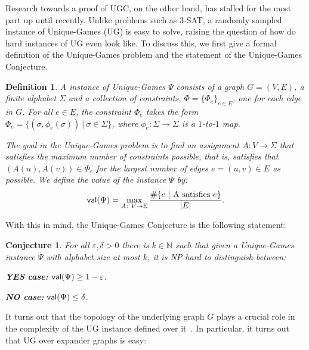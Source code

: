 \documentclass[11pt]{article}
\def \eps {{\varepsilon}}
\newtheorem{conjecture}[theorem]{Conjecture}
\newtheorem{definition}[theorem]{Definition}
\theoremstyle{definition}
\begin{document}
Research towards a proof of UGC, on the other hand, 
has stalled for the most part up until recently. Unlike problems such 
as $3$-SAT, a randomly sampled instance of Unique-Games (UG) is easy to solve, raising the question of how do hard instances of UG
even look like. To discuss this, we first give 
a formal definition of the Unique-Games problem and the statement of the Unique-Games Conjecture.
\begin{definition}
A instance of Unique-Games $\Psi$ consists of a graph $G = (V,E)$, 
a finite alphabet $\Sigma$ and a collection of constraints, 
$\Phi = \{\Phi_e\}_{e\in E}$, one for each edge in $G$. 
For all $e\in E$, the constraint $\Phi_e$ takes the form 
$\Phi_e = \{(\sigma, \phi_e(\sigma))~|~\sigma\in \Sigma\}$, 
where $\phi_e\colon \Sigma\to\Sigma$ is a $1$-to-$1$ map.

The goal in the Unique-Games problem is to find an assignment 
$A\colon V\to\Sigma$ that satisfies the maximum number of constraints possible, that is, satisfies that $(A(u),A(v))\in \Phi_{e}$ 
for the largest number of edges $e=(u,v)\in E$ as possible. We define
 the value of the instance $\Psi$ by:
\[
{\sf val}(\Psi) = \max_{A\colon V\to\Sigma}\frac{\#\{e~|~\text{A satisfies $e$}\}}{|E|}.
\]
\end{definition}
With this in mind, the Unique-Games Conjecture is the following statement:
\begin{conjecture}
For all $\eps,\delta>0$ there is $k\in\mathbb{N}$ such that 
given a Unique-Games instance $\Psi$ with alphabet size at most $k$,
it is NP-hard to distinguish between:

\textbf{YES case:} ${\sf val}(\Psi)\geq 1-\eps$.

\textbf{NO case:} ${\sf val}(\Psi)\leq \delta$.
\end{conjecture}

It turns out that the topology of the underlying graph $G$ plays a crucial role in the complexity of the UG instance defined over it~\cite{AroraKKSTV08,MMlocalexpander,DBLP:journals/eccc/AroraIMS10}. In particular, it 
turns out that UG over expander graphs is easy:

\end{document}
